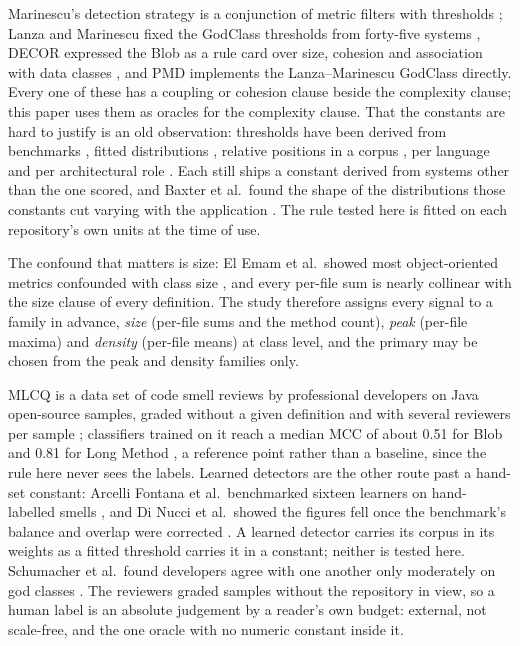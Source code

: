 \documentclass[11pt,a4paper]{article}
\begin{document}
Marinescu's detection strategy is a conjunction of metric filters with
thresholds \cite{marinescu2004}; Lanza and Marinescu fixed the GodClass
thresholds from forty-five systems \cite{lanza2006}, DECOR expressed the Blob
as a rule card over size, cohesion and association with data classes
\cite{moha2010}, and PMD implements the Lanza--Marinescu GodClass directly.
Every one of these has a coupling or cohesion clause beside the complexity
clause; this paper uses them as oracles for the complexity clause. That the
constants are hard to justify is an old observation: thresholds have been
derived from benchmarks \cite{alves2010}, fitted distributions
\cite{ferreira2012}, relative positions in a corpus \cite{oliveira2014}, per
language \cite{herbold2011} and per architectural role \cite{aniche2016}.
Each still ships a constant derived from systems other than the one scored, and Baxter et al.\ found the shape of the distributions
those constants cut varying with the application \cite{baxter2006}. The rule
tested here is fitted on each repository's own units at the time of use.

The confound that matters is size: El Emam et al.\ showed most
object-oriented metrics confounded with class size \cite{elemam2001}, and every
per-file sum is nearly collinear with the size clause of every definition. The
study therefore assigns every signal to a family in advance, \emph{size}
(per-file sums and the method count), \emph{peak} (per-file maxima) and
\emph{density} (per-file means) at class level, and the primary may be chosen
from the peak and density families only.

MLCQ is a data set of code smell reviews by professional developers on Java
open-source samples, graded without a given definition and with several
reviewers per sample \cite{mlcq2020}; classifiers trained on it reach a median
MCC of about 0.51 for Blob and 0.81 for Long Method \cite{mlcq2023}, a
reference point rather than a baseline, since the rule here never sees the
labels. Learned detectors are the other route past a hand-set constant:
Arcelli Fontana et al.\ benchmarked sixteen learners on hand-labelled smells
\cite{fontana2016}, and Di Nucci et al.\ showed the figures fell once the
benchmark's balance and overlap were corrected \cite{dinucci2018}. A learned
detector carries its corpus in its weights as a fitted threshold carries it
in a constant; neither is tested here. Schumacher et al.\ found developers agree with one another only
moderately on god classes \cite{schumacher2010}. The reviewers graded samples
without the repository in view, so a human label is an absolute judgement by a
reader's own budget: external, not scale-free, and the one oracle with no
numeric constant inside it.
\end{document}
